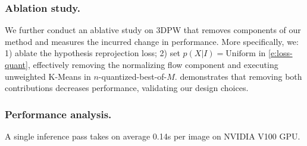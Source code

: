 % 
% 

\subsubsection{Ablation study.}
We further conduct an ablative study on 3DPW that removes components of our method and measures the incurred change in performance. More specifically, we: 1) ablate the hypothesis reprojection loss; 2) set $p(X|I)=\text{Uniform}$ in \cref{e:loss-quant}, effectively removing the normalizing flow component and executing unweighted K-Means in $n$-quantized-best-of-$M$.  demonstrates that removing both contributions decreases performance, validating our design choices.

\subsubsection{Performance analysis.}
A single inference pass takes on average 0.14s per image on NVIDIA V100 GPU.




% 

% 

% 






